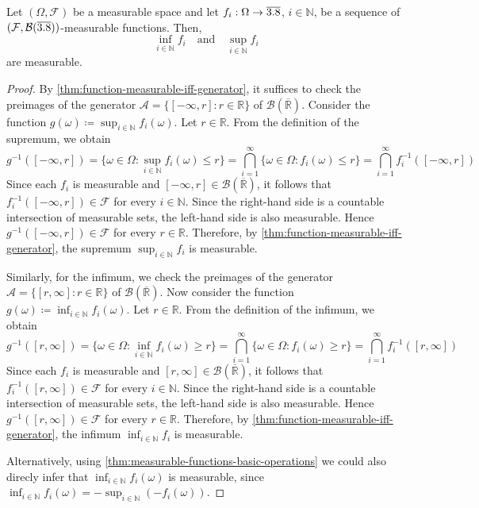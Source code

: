 \begin{theorem}\label{thm:sup-inf-measurable-functions}
Let $(\Omega,\mathcal{F})$ be a measurable space 
and let
$f_i : \Omega \to \overline{3.8}$, $i \in \mathbb{N}$, be a sequence of $(\mathcal{F}, \mathcal{B}(\overline{3.8}))$-measurable functions.
Then, 
\[
\inf_{i \in \mathbb{N}} f_i
\quad
\text{and}
\quad
\sup_{i \in \mathbb{N}} f_i
\]
are measurable.
\end{theorem}
\begin{proof}
By \autoref{thm:function-measurable-iff-generator}, it suffices to check the preimages of the generator
\(
\mathcal{A} = \{[-\infty,r] : r \in \mathbb{R}\}
\)
of $\mathcal{B}(\overline{\mathbb{R}})$.
Consider the function
\(
g(\omega) \coloneq \sup_{i \in \mathbb{N}} f_i(\omega)
\).
Let $r \in \mathbb{R}$. 
From the definition of the supremum, we obtain
\[
g^{-1}([-\infty,r])
=
\{\omega \in \Omega : \sup_{i \in \mathbb{N}} f_i(\omega) \le r\}
=
\bigcap_{i=1}^{\infty}
\{\omega \in \Omega : f_i(\omega) \le r\}
=
\bigcap_{i=1}^{\infty} f_i^{-1}([-\infty,r])
\]
Since each $f_i$ is measurable and $[-\infty,r] \in \mathcal{B}(\overline{\mathbb{R}})$, it follows that
\(
f_i^{-1}([-\infty,r]) \in \mathcal{F}
\)
for every $i \in \mathbb{N}$. 
Since the right-hand side is a countable intersection of measurable sets, the left-hand side is also measurable. 
Hence $g^{-1}([-\infty,r]) \in \mathcal{F}$ for every $r \in \mathbb{R}$. 
Therefore, by \autoref{thm:function-measurable-iff-generator}, the supremum $\sup_{i \in \mathbb{N}} f_i$ is measurable.


Similarly, for the infimum, we check the preimages of the generator $\mathcal{A} = \{[r, \infty] : r \in \mathbb{R}\}$ of $\mathcal{B}(\overline{\mathbb{R}})$.
Now consider the function
\(
g(\omega) \coloneq \inf_{i \in \mathbb{N}} f_i(\omega)
\).
Let $r \in \mathbb{R}$.
From the definition of the infimum, we obtain
\[
g^{-1}([r, \infty])
=
\{\omega \in \Omega : \inf_{i \in \mathbb{N}} f_i(\omega) \ge r\}
=
\bigcap_{i=1}^{\infty}\{\omega \in \Omega : f_i(\omega) \ge r\}
=
\bigcap_{i=1}^{\infty} f_i^{-1}([r, \infty])
\]
Since each $f_i$ is measurable and $[r, \infty] \in \mathcal{B}(\overline{\mathbb{R}})$, it follows that
\(
f_i^{-1}([r, \infty]) \in \mathcal{F}
\)
for every $i \in \mathbb{N}$.
Since the right-hand side is a countable intersection of measurable sets, the left-hand side is also measurable.
Hence $g^{-1}([r, \infty]) \in \mathcal{F}$ for every $r \in \mathbb{R}$.
Therefore, by \autoref{thm:function-measurable-iff-generator}, the infimum $\inf_{i \in \mathbb{N}} f_i$ is measurable.

Alternatively, using \autoref{thm:measurable-functions-basic-operations} we could also direcly infer that $\inf_{i \in \mathbb{N}} f_i(\omega)$ is measurable, since
\(
\inf_{i \in \mathbb{N}} f_i(\omega)
=
-\sup_{i \in \mathbb{N}}(-f_i(\omega))
\).
\end{proof}

